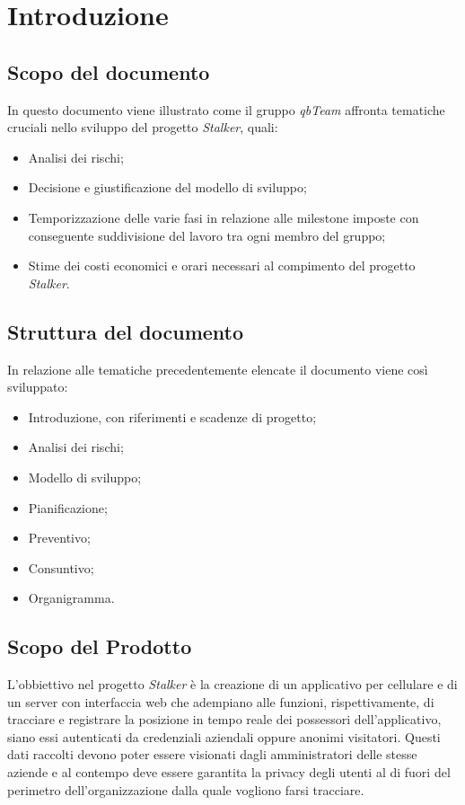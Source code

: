\section{Introduzione}
\subsection{Scopo del documento}
In questo documento viene illustrato come  il gruppo \textit{qbTeam} affronta tematiche cruciali nello sviluppo del progetto \textit{Stalker}, quali:
\begin{itemize}
    \item Analisi dei rischi;
    \item Decisione e giustificazione del modello di sviluppo;
    \item Temporizzazione delle varie fasi in relazione alle milestone imposte con conseguente suddivisione del lavoro tra ogni membro del gruppo;
    \item Stime dei costi economici e orari necessari al compimento del progetto \textit{Stalker}.
\end{itemize}

\subsection{Struttura del documento}
In relazione alle tematiche precedentemente elencate il documento viene così sviluppato:
\begin{itemize}
    \item Introduzione, con riferimenti e scadenze di progetto;
    \item Analisi dei rischi;
    \item Modello di sviluppo;
    \item Pianificazione;
    \item Preventivo;
    \item Consuntivo;
    \item Organigramma.
\end{itemize}

\subsection{Scopo del Prodotto}
L'obbiettivo nel progetto \textit{Stalker} è la creazione di un applicativo per cellulare e di un server con interfaccia web che adempiano alle funzioni, rispettivamente, di 
tracciare e registrare la posizione in tempo reale dei possessori dell'applicativo, siano essi autenticati da credenziali aziendali oppure anonimi visitatori.
Questi dati raccolti devono poter essere visionati dagli amministratori delle stesse aziende e al contempo deve essere garantita la privacy degli utenti al di fuori del perimetro dell'organizzazione dalla quale vogliono farsi tracciare.

